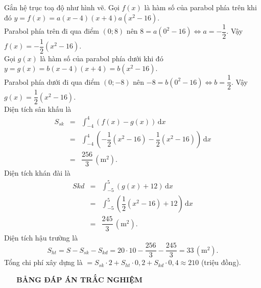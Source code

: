 \begin{ex}
{Gắn hệ trục toạ độ như hình vẽ. Gọi $f(x)$ là hàm số của parabol phía trên khi đó $y=f(x)=a(x-4)(x+4)a(x^2-16)$.\\
Parabol phía trên đi qua điểm $(0;8)$ nên $8=a(0^2-16)\Leftrightarrow a=-\dfrac{1}{2}$. Vậy $f(x)=-\dfrac{1}{2}(x^2-16)$.\\
Gọi $g(x)$ là hàm số của parabol phía dưới khi đó $y=g(x)=b(x-4)(x+4)=b(x^2-16)$.\\
Parabol phía dưới đi qua điểm $(0;-8)$ nên $-8=b(0^2-16)\Leftrightarrow b=\dfrac{1}{2}$. Vậy $g(x)=\dfrac{1}{2}(x^2-16)$.\\
Diện tích sân khấu là
\begin{eqnarray*}
S_{sk}&=&\displaystyle \int_{-4}^{4}\left(f(x)-g(x)\right)\mathrm{\,d}x\\
&=& \displaystyle \int_{-4}^{4}\left(-\dfrac{1}{2}(x^2-16)-\dfrac{1}{2}(x^2-16)\right)\mathrm{\,d}x\\
&=& \dfrac{256}{3}\, (\text{m}^2).
\end{eqnarray*}
Diện tích khán đài là
\begin{eqnarray*}
S{kd}&=&\displaystyle\int_{-5}^{5}\left(g(x)+12\right)\mathrm{\,d}x\\
&=& \displaystyle\int_{-5}^{5}\left(\dfrac{1}{2}(x^2-16)+12\right)\mathrm{\,d}x\\
&=& \dfrac{245}{3}\,(\text{m}^2).
\end{eqnarray*}
Diện tích hậu trường là
\[S_{ht}=S-S_{sk}-S_{kd}=20\cdot 10-\dfrac{256}{3}-\dfrac{245}{3}=33\, (\text{m}^2).\]
Tổng chi phí xây dựng là $=S_{sk}\cdot 2+S_{ht}\cdot 0{,}2+S_{kd}\cdot 0{,}4\approx 210$ (triệu đồng).
}
\end{ex}


\newpage

\begin{center}
    \bfseries\faGg~\faGg~\faGg~BẢNG ĐÁP ÁN TRẮC NGHIỆM~\faGg~\faGg~\faGg
\end{center}
\newpage
